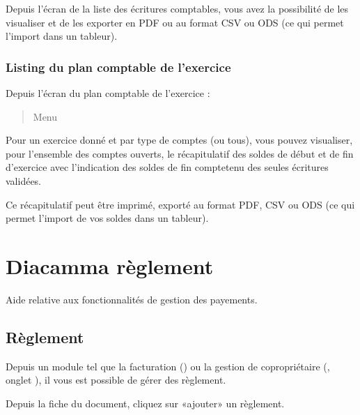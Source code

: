 \documentclass[a4paper,10pt,oneside,french]{sphinxmanual}
\begin{document}
\sphinxAtStartPar
Depuis l’écran de la liste des écritures comptables, vous avez la possibilité de les visualiser et de les exporter en PDF ou au format CSV ou ODS (ce qui permet l’import dans un tableur).


\subsection{Listing du plan comptable de l’exercice}
\label{\detokenize{accounting/reporting:listing-du-plan-comptable-de-l-exercice}}
\sphinxAtStartPar
Depuis l’écran du plan comptable de l’exercice :
\begin{quote}

\sphinxAtStartPar
Menu 
\end{quote}

\sphinxAtStartPar
Pour un exercice donné et par type de comptes (ou tous), vous pouvez visualiser, pour l’ensemble des comptes ouverts, le récapitulatif des soldes de début et de fin d’exercice avec l’indication des soldes de fin compte\sphinxhyphen{}tenu des seules écritures validées.

\sphinxAtStartPar
Ce récapitulatif peut être imprimé, exporté au format PDF, CSV ou ODS (ce qui permet l’import de vos soldes dans un tableur).

\sphinxstepscope


\chapter{Diacamma règlement}
\label{\detokenize{payoff/index:diacamma-reglement}}\label{\detokenize{payoff/index::doc}}
\sphinxAtStartPar
Aide relative aux fonctionnalités de gestion des payements.

\sphinxstepscope


\section{Règlement}
\label{\detokenize{payoff/payoff:reglement}}\label{\detokenize{payoff/payoff::doc}}
\sphinxAtStartPar
Depuis un module tel que la facturation () ou la gestion de copropriétaire (, onglet ), il vous est possible de gérer des règlement.

\sphinxAtStartPar
Depuis la fiche du document, cliquez sur «ajouter» un règlement.
\begin{quote}

\noindent{}
\end{quote}
\end{document}
